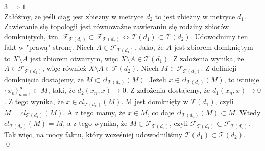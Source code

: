 \documentclass{article}
\theoremstyle{definition}%
\theoremstyle{theorem}
\renewenvironment{proof}{{\bfseries Rozwiązanie}}{\qed}
\begin{document}
\begin{proof}
		$3\implies1$\\
		Załóżmy, że jeśli ciąg jest zbieżny w metryce $d_2$ to jest zbieżny w metryce $d_1$. Zawieranie się topologii jest równoważne zawieraniu się rodziny zbiorów domkniętych, tzn. $\mathcal{F}_{\mathcal{T}(d_1)}\subset\mathcal{F}_{\mathcal{T}(d_2)}\Longleftrightarrow\mathcal{T}(d_1)\subset\mathcal{T}(d_2)$. Udowodnimy ten fakt w "prawą" stronę. Niech $A\in\mathcal{F}_{\mathcal{T}(d_1)}$. Jako, że $A$ jest zbiorem domkniętym to $X\setminus A$ jest zbiorem otwartym, więc $X\setminus A\in\mathcal{T}(d_1)$. Z założenia wynika, że $A\in\mathcal{F}_{\mathcal{T}(d_2)}$, więc również $X\setminus A\in\mathcal{T}(d_2)$. Niech $M\in\mathcal{F}_{\mathcal{T}(d_1)}$. Z definicji domknięcia dostajemy, że $M\subset cl_{\mathcal{T}(d_2)}(M)$. Jeżeli $x\in cl_{\mathcal{T}(d_2)}(M)$, to istnieje $\{x_n\}_{n=1}^\infty \subset M$, taki, że $d_2(x_n,x)\to 0$. Z założenia dostajemy, że $d_1(x_n,x)\to 0$. Z tego wynika, że $x\in cl_{\mathcal{T}(d_1)}(M)$. M jest domknięty w $\mathcal{T}(d_1)$, czyli $M=cl_{\mathcal{T}(d_1)}(M)$. A z tego mamy, że $x\in M$, co daje
		$cl_{\mathcal{T}(d_2)}(M)\subset M$. Wtedy $cl_{\mathcal{T}(d_2)}(M)=M$, a z tego wynika, że $M\in \mathcal{F}_{\mathcal{T}(d_2)}$, czyli  $\mathcal{F}_{\mathcal{T}(d_1)}\subset \mathcal{F}_{\mathcal{T}(d_2)}$. Tak więc, na mocy faktu, który wcześniej udowodniliśmy $\mathcal{T}(d_1)\subset\mathcal{T}(d_2)$.\\
		\end{proof}
\end{document}
